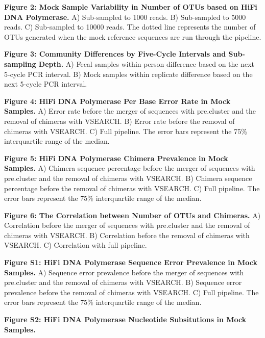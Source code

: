 \documentclass[12pt,]{article}
\begin{document}
\textbf{Figure 2: Mock Sample Variability in Number of OTUs based on
HiFi DNA Polymerase.} A) Sub-sampled to 1000 reads. B) Sub-sampled to
5000 reads. C) Sub-sampled to 10000 reads. The dotted line represents
the number of OTUs generated when the mock reference sequences are run
through the pipeline.

\textbf{Figure 3: Community Differences by Five-Cycle Intervals and
Sub-sampling Depth.} A) Fecal samples within person difference based on
the next 5-cycle PCR interval. B) Mock samples within replicate
difference based on the next 5-cycle PCR interval.

\textbf{Figure 4: HiFi DNA Polymerase Per Base Error Rate in Mock
Samples.} A) Error rate before the merger of sequences with pre.cluster
and the removal of chimeras with VSEARCH. B) Error rate before the
removal of chimeras with VSEARCH. C) Full pipeline. The error bars
represent the 75\% interquartile range of the median.

\textbf{Figure 5: HiFi DNA Polymerase Chimera Prevalence in Mock
Samples.} A) Chimera sequence percentage before the merger of sequences
with pre.cluster and the removal of chimeras with VSEARCH. B) Chimera
sequence percentage before the removal of chimeras with VSEARCH. C) Full
pipeline. The error bars represent the 75\% interquartile range of the
median.

\textbf{Figure 6: The Correlation between Number of OTUs and Chimeras.}
A) Correlation before the merger of sequences with pre.cluster and the
removal of chimeras with VSEARCH. B) Correlation before the removal of
chimeras with VSEARCH. C) Correlation with full pipeline.

\newpage

\textbf{Figure S1: HiFi DNA Polymerase Sequence Error Prevalence in Mock
Samples.} A) Sequence error prevalence before the merger of sequences
with pre.cluster and the removal of chimeras with VSEARCH. B) Sequence
error prevalence before the removal of chimeras with VSEARCH. C) Full
pipeline. The error bars represent the 75\% interquartile range of the
median.

\textbf{Figure S2: HiFi DNA Polymerase Nucleotide Subsitutions in Mock
Samples.}
\end{document}

